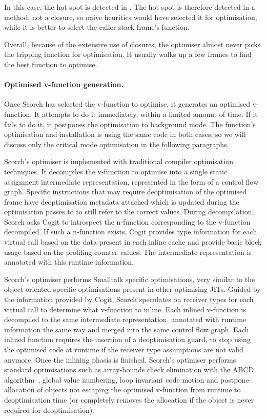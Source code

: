 \documentclass[a4paper,12pt,twoside]{../includes/ThesisStyle}
\begin{document}
In this case, the hot spot is detected in . The hot spot is therefore detected in a method, not a closure, so naive heuritics would have selected it for optimisation, while it is better to select the caller stack frame's function.

Overall, because of the extensive use of closures, the optimiser almost never picks the tripping function for optimisation. It usually walks up a few frames to find the best function to optimise. 

\paragraph{Optimised v-function generation.}
Once Scorch has selected the v-function to optimise, it generates an optimised v-function. It attempts to do it immediately, within a limited amount of time. If it fails to do it, it postpones the optimisation to background mode. The function's optimisation and installation is using the same code in both cases, so we will discuss only the critical mode optimisation in the following paragraphs.

Scorch's optimiser is implemented with traditional compiler optimisation techniques. It decompiles the v-function to optimise into a single static assignment intermediate representation, represented in the form of a control flow graph. Specific instructions that may require deoptimisation of the optimised frame have deoptimisation metadata attached which is updated during the optimisation passes to to still refer to the correct values. During decompilation, Scorch asks Cogit to introspect the n-function corresponding to the v-function decompiled. If such a n-function exists, Cogit provides type information for each virtual call based on the data present in each inline cache and provide basic block usage based on the profiling counter values. The intermediate representation is annotated with this runtime information.


Scorch's optimiser performs Smalltalk specific optimisations, very similar to the object-oriented specific optimisations present in other optimising JITs. Guided by the information provided by Cogit, Scorch speculates on receiver types for each virtual call to determine what v-function to inline. Each inlined v-function is decompiled to the same intermediate representation, annotated with runtime information the same way and merged into the same control flow graph. Each inlined function requires the insertion of a deoptimisation guard, to stop using the optimised code at runtime if the receiver type assumptions are not valid anymore. Once the inlining phasis is finished, Scorch's optimiser performs standard optimisations such as array-bounds check elimination with the ABCD algorithm~\cite{Bodi00a}, global value numbering, loop invariant code motion and postpone allocation of objects not escaping the optimised v-function from runtime to deoptimisation time (or completely removes the allocation if the object is never required for deoptimisation).
\end{document}
